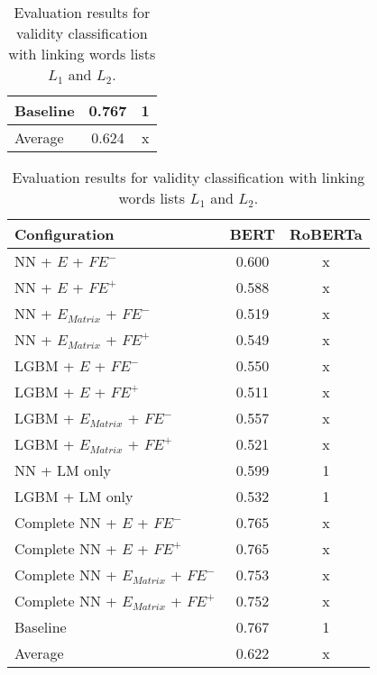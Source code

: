 \begin{table}[h]
\begin{subtable}{.5\textwidth}
\begin{tabular}{|| l || c | c ||}
 			\hline
 			Baseline & 0.767 & 1 \\
 			\hline
 			\hline
 			Average & 0.624 & x \\
 			\hline
		\end{tabular}
		\renewcommand{\arraystretch}{1}
  		\caption{Linking word list $L_1$.}%
  	\end{subtable}%
  	\begin{subtable}{.5\textwidth}
		\centering
  		\renewcommand{\arraystretch}{1.4}
   		\begin{tabular}{|| l || c | c ||}
   			\hline
   			{Configuration} & {BERT} & {RoBERTa} \\
   			\hline\hline
   			NN + $E$ + $\textit{FE}^-$ &  0.600 & x \\
 			\hline
 			NN + $E$ + $\textit{FE}^+$ & 0.588 & x \\
 			\hline
 			NN + $E_{Matrix}$ + $\textit{FE}^-$ & 0.519 & x \\
 			\hline
 			NN + $E_{Matrix}$ + $\textit{FE}^+$ & 0.549 & x \\
 			\hline
 			LGBM + $E$ + $\textit{FE}^-$ &  0.550 & x \\
 			\hline
 			LGBM + $E$ + $\textit{FE}^+$ & 0.511 & x \\
 			\hline
 			LGBM + $E_{Matrix}$ + $\textit{FE}^-$ & 0.557 & x \\
 			\hline
 			LGBM + $E_{Matrix}$ + $\textit{FE}^+$ & 0.521 & x \\
 			\hline
 			NN + LM only & 0.599 & 1 \\
 			\hline
 			LGBM + LM only & 0.532 & 1 \\
 			\hline
 			Complete NN + $E$ + $\textit{FE}^-$ & 0.765 & x \\
 			\hline
 			Complete NN + $E$ + $\textit{FE}^+$ & 0.765 & x \\
 			\hline
 			Complete NN + $E_{Matrix}$ + $\textit{FE}^-$ & 0.753 & x \\
 			\hline
 			Complete NN + $E_{Matrix}$ + $\textit{FE}^+$ & 0.752 & x \\
 			\hline
 			Baseline & 0.767 & 1\\
 			\hline
 			\hline
 			Average & 0.622 & x \\
 			\hline
		\end{tabular}
		\renewcommand{\arraystretch}{1}
  		\caption{Linking word list $L_2$.}%
  	\end{subtable}
  	\caption{Evaluation results for validity classification with linking words lists $L_1$ and $L_2$.}%
  	\label{fig:validityresults}
\end{table}

